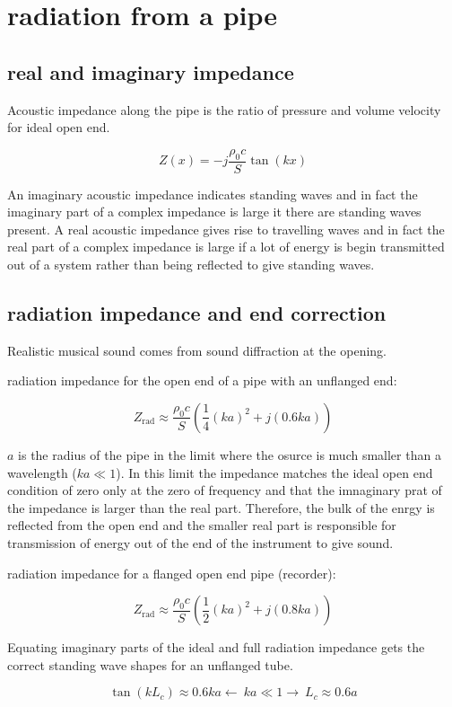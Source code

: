 \documentclass[10pt, a4paper, twocolumn]{article}
\newcommand{\arr}{\ensuremath{\longrightarrow\ }}
\newcommand{\larr}{\ensuremath{\longleftarrow\ }}
\begin{document}
\section{radiation from a pipe}
\subsection{real and imaginary impedance}

Acoustic impedance along the pipe is the ratio of pressure and volume velocity for ideal open end.

\[ Z(x) = -j\frac{\rho _0 c}{S}\tan (kx) \]

An imaginary acoustic impedance indicates standing waves and in fact the imaginary part of a complex impedance is large it there are standing waves present. A real acoustic impedance gives rise to travelling waves and in fact the real part of a complex impedance is large if a lot of energy is begin transmitted out of a system rather than being reflected to give standing waves.

\subsection{radiation impedance and end correction}

Realistic musical sound comes from sound diffraction at the opening.

radiation impedance for the open end of a pipe with an unflanged end:

\[Z_\mathrm{rad}\approx\frac{\rho _0c}{S}
\left(\frac14 (ka)^2 + j(0.6ka)\right) \]

$a$ is the radius of the pipe in the limit where the osurce is much smaller than a wavelength ($ka\ll 1$). In this limit the impedance matches the ideal open end condition of zero only at the zero of frequency and that the imnaginary prat of the impedance is larger than the real part. Therefore, the bulk of the enrgy is reflected from the open end and the smaller real part is responsible for transmission of energy out of the end of the instrument to give sound.

radiation impedance for a flanged open end pipe (recorder):

\[Z_\mathrm{rad}\approx\frac{\rho _0c}{S}
\left(\frac12 (ka)^2 + j(0.8ka)\right) \]

Equating imaginary parts of the ideal and full radiation impedance gets the correct standing wave shapes for an unflanged tube.

\[ \tan (kL_c) \approx 0.6ka
\larr ka \ll 1 \arr L_c \approx 0.6a\]
\end{document}
